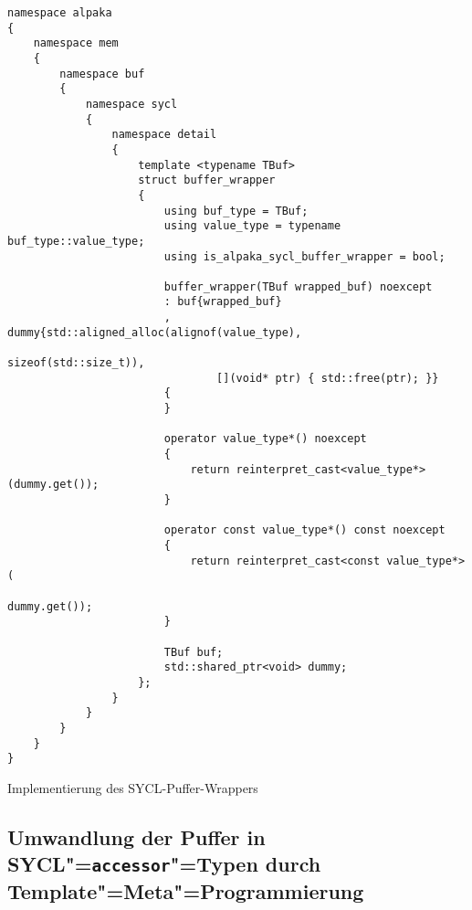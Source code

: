 \begin{code}
    \begin{verbatim}
namespace alpaka
{
    namespace mem
    {
        namespace buf
        {
            namespace sycl
            {
                namespace detail
                {
                    template <typename TBuf>
                    struct buffer_wrapper
                    {
                        using buf_type = TBuf;
                        using value_type = typename buf_type::value_type;
                        using is_alpaka_sycl_buffer_wrapper = bool;

                        buffer_wrapper(TBuf wrapped_buf) noexcept
                        : buf{wrapped_buf}
                        , dummy{std::aligned_alloc(alignof(value_type),
                                                   sizeof(std::size_t)),
                                [](void* ptr) { std::free(ptr); }}
                        {
                        }

                        operator value_type*() noexcept
                        {
                            return reinterpret_cast<value_type*>(dummy.get());
                        }

                        operator const value_type*() const noexcept
                        {
                            return reinterpret_cast<const value_type*>(
                                                                dummy.get());
                        }

                        TBuf buf;
                        std::shared_ptr<void> dummy;
                    };
                }
            }
        }
    }
}
    \end{verbatim}
    \caption{Implementierung des SYCL-Puffer-Wrappers}
\end{code}

\subsection{Umwandlung der Puffer in SYCL"=\texttt{accessor}"=Typen durch
Template"=Meta"=Programmierung}
\label{anhang:source:cpp:kernelzeigeracctrans}

